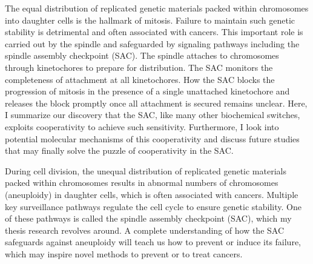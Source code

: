 The equal distribution of replicated genetic materials packed within chromosomes into daughter cells is the hallmark of mitosis. Failure to maintain such genetic stability is detrimental and often associated with cancers. This important role is carried out by the spindle and safeguarded by signaling pathways including the spindle assembly checkpoint (SAC). The spindle attaches to chromosomes through kinetochores to prepare for distribution. The SAC monitors the completeness of attachment at all kinetochores. How the SAC blocks the progression of mitosis in the presence of a single unattached kinetochore and releases the block promptly once all attachment is secured remains unclear. Here, I summarize our discovery that the SAC, like many other biochemical switches, exploits cooperativity to achieve such sensitivity. Furthermore, I look into potential molecular mechanisms of this cooperativity and discuss future studies that may finally solve the puzzle of cooperativity in the SAC.


During cell division, the unequal distribution of replicated genetic materials packed within chromosomes results in abnormal numbers of chromosomes (aneuploidy) in daughter cells, which is often associated with cancers. Multiple key surveillance pathways regulate the cell cycle to ensure genetic stability. One of these pathways is called the spindle assembly checkpoint (SAC), which my thesis research revolves around. A complete understanding of how the SAC safeguards against aneuploidy will teach us how to prevent or induce its failure, which may inspire novel methods to prevent or to treat cancers.

